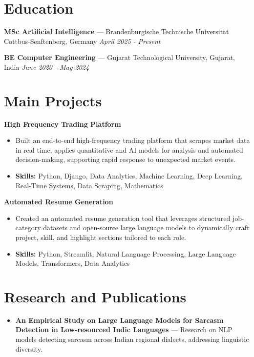 \documentclass[a4paper,10pt]{article}
\begin{document}
\section*{Education}
\textbf{MSc Artificial Intelligence} — Brandenburgische Technische Universität Cottbus-Senftenberg, Germany \hfill \textit{April 2025 - Present}\par
\vspace{1.5pt}
\textbf{BE Computer Engineering} — Gujarat Technological University, Gujarat, India \hfill \textit{June 2020 - May 2024}\par

\section*{Main Projects}
\textbf{High Frequency Trading Platform}\par
\vspace{1pt}
\begin{itemize}
  \item Built an end-to-end high-frequency trading platform that scrapes market data in real time, applies quantitative and AI models for analysis and automated decision-making, supporting rapid response to unexpected market events.
  \item \textbf{Skills:} Python, Django, Data Analytics, Machine Learning, Deep Learning, Real-Time Systems, Data Scraping, Mathematics
\end{itemize}
\vspace{3pt}
\textbf{Automated Resume Generation}\par
\vspace{1pt}
\begin{itemize}
  \item Created an automated resume generation tool that leverages structured job-category datasets and open-source large language models to dynamically craft project, skill, and highlight sections tailored to each role.
  \item \textbf{Skills:} Python, Streamlit, Natural Language Processing, Large Language Models, Transformers, Data Analytics
\end{itemize}

\section*{Research and Publications}
\begin{itemize}
\item \textbf{An Empirical Study on Large Language Models for Sarcasm Detection in Low-resourced Indic Languages} — Research on NLP models detecting sarcasm across Indian regional dialects, addressing linguistic diversity.
\end{itemize}
\end{document}
